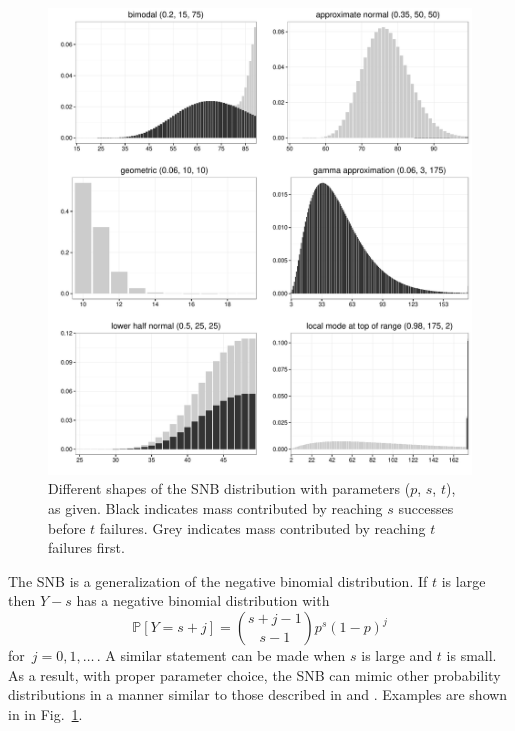 \documentclass[review]{elsarticle}
\begin{document}
\begin{figure}[p!]
\begin{center}
\includegraphics[width=\textwidth]{shapes.pdf}
\end{center}
\caption{Different shapes of the SNB distribution with parameters 
($p$, $s$, $t$), as given. Black indicates mass contributed by reaching
$s$ successes before $t$ failures. Grey indicates
mass contributed by reaching $t$ failures first. \label{shapes.fig}}
\end{figure}

The SNB is a generalization of the negative 
binomial distribution. If $t$ is large then $Y-s$ has a 
negative binomial distribution with
\begin{equation*}                                    %
\mathbb{P}[Y=s+j]        \label{nb1.eq}          
  = {{s+j-1}\choose{s-1}} p^s (1-p)^j
\end{equation*}
for $\,j=0, 1,\ldots\,$. A similar statement can be made when $s$ is large
and $t$ is small. As a result, with proper parameter choice, the SNB
can mimic other probability distributions in a manner similar to 
those described in \cite{Peizer1968} and \cite{Best1974}. Examples are
shown in in Fig.~\ref{shapes.fig}. 
\end{document}
